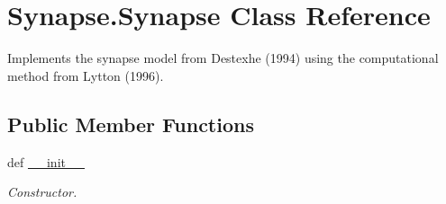 \hypertarget{class_synapse_1_1_synapse}{\section{Synapse.\-Synapse Class Reference}
\label{class_synapse_1_1_synapse}
}


Implements the synapse model from Destexhe (1994) using the computational method from Lytton (1996).  


\subsection*{Public Member Functions}
\begin{DoxyCompactItemize}
\item 
def \hyperlink{class_synapse_1_1_synapse_a2503e88be21ea89ad4f652b2fedfd76e}{\-\_\-\-\_\-init\-\_\-\-\_\-}
\begin{DoxyCompactList}\small\item\em Constructor. \end{DoxyCompactList}\end{DoxyCompactItemize}
